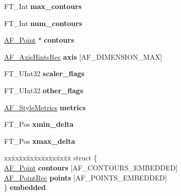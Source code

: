 \begin{DoxyCompactItemize}
\item 
\mbox{\label{struct_a_f___glyph_hints_rec___a35a606267660f48f4ad8d760c2ef4923}} 
F\+T\+\_\+\+Int {\bfseries max\+\_\+contours}
\item 
\mbox{\label{struct_a_f___glyph_hints_rec___a18ba949b227ee6fa34355872546209ed}} 
F\+T\+\_\+\+Int {\bfseries num\+\_\+contours}
\item 
\mbox{\label{struct_a_f___glyph_hints_rec___a3ee48b0ccf627aa1d84895aa2a058e57}} 
\hyperlink{struct_a_f___point_rec__}{A\+F\+\_\+\+Point} $\ast$ {\bfseries contours}
\item 
\mbox{\label{struct_a_f___glyph_hints_rec___a88d06a7880ba2423c73f937b7baedb46}} 
\hyperlink{struct_a_f___axis_hints_rec__}{A\+F\+\_\+\+Axis\+Hints\+Rec} {\bfseries axis} \mbox{[}A\+F\+\_\+\+D\+I\+M\+E\+N\+S\+I\+O\+N\+\_\+\+M\+AX\mbox{]}
\item 
\mbox{\label{struct_a_f___glyph_hints_rec___acec0d3686263f68031080d9207e2ccf5}} 
F\+T\+\_\+\+U\+Int32 {\bfseries scaler\+\_\+flags}
\item 
\mbox{\label{struct_a_f___glyph_hints_rec___a4c6825c53e6f2c234b20cc07edb0bb85}} 
F\+T\+\_\+\+U\+Int32 {\bfseries other\+\_\+flags}
\item 
\mbox{\label{struct_a_f___glyph_hints_rec___a15d4537375cfaf3369e12431e1c220ea}} 
\hyperlink{struct_a_f___style_metrics_rec__}{A\+F\+\_\+\+Style\+Metrics} {\bfseries metrics}
\item 
\mbox{\label{struct_a_f___glyph_hints_rec___a0ac4de48acaeff02893732d214e140cd}} 
F\+T\+\_\+\+Pos {\bfseries xmin\+\_\+delta}
\item 
\mbox{\label{struct_a_f___glyph_hints_rec___afb54e12df9090871946f1386bb5a5719}} 
F\+T\+\_\+\+Pos {\bfseries xmax\+\_\+delta}
\item 
\mbox{\label{struct_a_f___glyph_hints_rec___aa44f4c357a800a0f4dece71ef0133698}} 
\begin{tabbing}
xx\=xx\=xx\=xx\=xx\=xx\=xx\=xx\=xx\=\kill
struct \{\\
\>\hyperlink{struct_a_f___point_rec__}{AF\_Point} {\bfseries contours} \mbox{[}AF\_CONTOURS\_EMBEDDED\mbox{]}\\
\>\hyperlink{struct_a_f___point_rec__}{AF\_PointRec} {\bfseries points} \mbox{[}AF\_POINTS\_EMBEDDED\mbox{]}\\
\} {\bfseries embedded}\\


\end{tabbing}
\end{DoxyCompactItemize}
